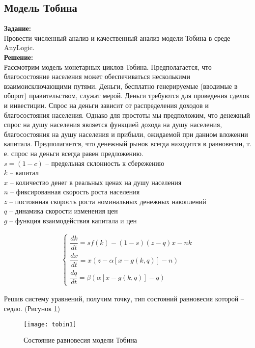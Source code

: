 \subsection*{Модель Тобина}

\textbf{Задание:}\\
Провести численный анализ и качественный анализ модели Тобина в среде AnyLogic.\\

\textbf{Решение:}\\
Рассмотрим модель монетарных циклов Тобина. Предполагается, что благосостояние населения может обеспечиваться несколькими взаимоисключающими путями. Деньги, бесплатно генерируемые (вводимые в оборот) правительством, служат мерой. Деньги требуются для проведения сделок и инвестиции. Спрос на деньги зависит от распределения доходов и благосостояния населения. Однако для простоты мы предположим, что денежный спрос на душу населения является функцией дохода на душу населения, благосостояния на душу населения и прибыли, ожидаемой при данном вложении капитала. Предполагается, что денежный рынок всегда находится в равновесии, т. е. спрос на деньги всегда равен предложению.\\

$s = (1 - c)$ -- предельная склонность к сбережению\\
$k$ -- капитал\\
$x$ -- количество денег в реальных ценах на душу населения\\
$n$ -- фиксированная скорость роста населения\\
$z$ -- постоянная скорость роста номинальных денежных накоплений\\
$q$ -- динамика скорости изменения цен\\
$g$ -- функция взаимодействия капитала и цен

\begin{align*}
	\begin{cases}
		\dfrac{dk}{dt} = s f(k) - (1 - s)(z - q)x - nk\\[10pt]
		\dfrac{dx}{dt} = x(z - \alpha[x - g(k, q)] - n)\\[10pt]
		\dfrac{dq}{dt} = \beta (\alpha [x - g(k, q)] - q)
	\end{cases}
\end{align*}

\newpage

Решив систему уравнений, получим точку, тип состояний равновесия которой -- седло. (Рисунок \ref{fig:tobin1})
\begin{figure}[h]
	\centering \texttt{[image: tobin1]}
	\caption{Состояние равновесия модели Тобина}
	\label{fig:tobin1}
\end{figure}

